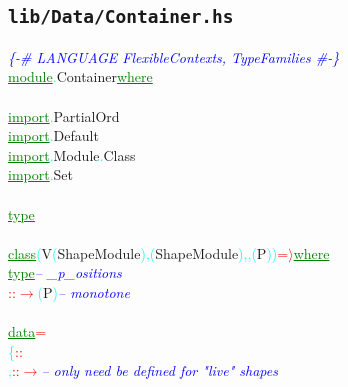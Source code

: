 \subsection{\texttt{lib/Data/Container.hs}}
\label{mod:Data.Container}
\textcolor{blue}{{\it{}\{-\# LANGUAGE FlexibleContexts, TypeFamilies \#-\}}}\\\textcolor{green}{\underline{module}}\textcolor{cyan}{.}{\rm{}Container}\hsspace \textcolor{green}{\underline{where}}\\\\\textcolor{green}{\underline{import}}\textcolor{cyan}{.}{\rm{}PartialOrd}\\\textcolor{green}{\underline{import}}\textcolor{cyan}{.}{\rm{}Default}\\\textcolor{green}{\underline{import}}\textcolor{cyan}{.}{\rm{}Module}\textcolor{cyan}{.}{\rm{}Class}\\\textcolor{green}{\underline{import}}\textcolor{cyan}{.}{\rm{}Set}\\\\\textcolor{green}{\underline{type}}\\\\\textcolor{green}{\underline{class}}\hsspace \textcolor{cyan}{(}{\rm{}V}\hsspace \textcolor{cyan}{(}{\rm{}ShapeModule}\textcolor{cyan}{)}\hsspace \textcolor{red}{\tilde{ }}\textcolor{cyan}{,}\hsspace \textcolor{cyan}{(}{\rm{}ShapeModule}\textcolor{cyan}{)}\textcolor{cyan}{,}\textcolor{cyan}{,}\hsspace \textcolor{cyan}{(}{\rm{}P}\textcolor{cyan}{)}\textcolor{cyan}{)}\hsspace \textcolor{red}{=\ensuremath{\rangle}}\hsspace \textcolor{green}{\underline{where}}\\\hstab \textcolor{green}{\underline{type}}\hsspace \textcolor{blue}{{\it{}-- \_p\_ositions}}\\\hsspace \textcolor{red}{::}\hsspace \textcolor{red}{\ensuremath{\rightarrow}}\hsspace \textcolor{cyan}{(}{\rm{}P}\textcolor{cyan}{)}\hsspace \textcolor{blue}{{\it{}-- monotone}}\\\\\textcolor{green}{\underline{data}}\hsspace \textcolor{red}{=}\\\hstab \textcolor{cyan}{\{}\hsspace \hsspace \hsspace \hsspace \textcolor{red}{::}\\\hstab \textcolor{cyan}{,}\hsspace \textcolor{red}{::}\hsspace \textcolor{red}{\ensuremath{\rightarrow}}\hsspace \textcolor{blue}{{\it{}-- only need be defined for "live" shapes}}\\\hstab 